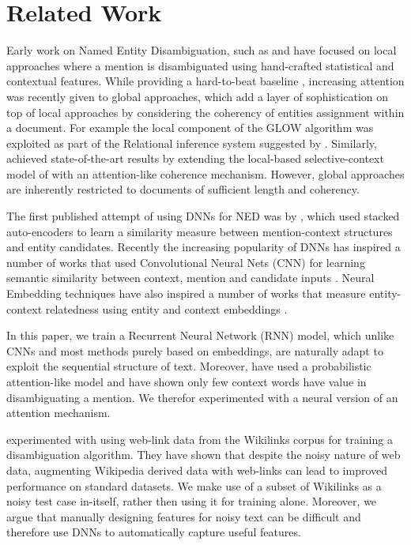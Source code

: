 \documentclass[11pt]{article}
\begin{document}
	\section{Related Work}
	
	Early work on Named Entity Disambiguation, such as  and  have focused on local approaches where a mention is disambiguated using hand-crafted statistical and contextual features. While providing a hard-to-beat baseline \cite{Ratinov2011}, increasing attention was recently given to global approaches, which add a layer of sophistication on top of local approaches by considering the coherency of entities assignment within a document. For example the local component of the GLOW algorithm \cite{Ratinov2011} was exploited as part of the Relational inference system suggested by . Similarly,  achieved state-of-the-art results by extending the local-based selective-context model of  with an attention-like coherence mechanism. However, global approaches are inherently restricted to documents of sufficient length and coherency.
	
	The first published attempt of using DNNs for NED was by , which used stacked auto-encoders to learn a similarity measure between mention-context structures and entity candidates. Recently the increasing popularity of DNNs has inspired a number of works that used Convolutional Neural Nets (CNN) for learning semantic similarity between context, mention and candidate inputs \cite{sun2015modeling,francis2016capturing}. Neural Embedding techniques have also inspired a number of works that measure entity-context relatedness using entity and context embeddings \cite{yamada2016joint,Hu2015Entity}.
	
	In this paper, we train a Recurrent Neural Network (RNN) model, which unlike CNNs and most methods purely based on embeddings, are naturally adapt to exploit the sequential structure of text. Moreover,  have used a probabilistic attention-like model and have shown only few context words have value in disambiguating a mention. We therefor experimented with a neural version of an attention mechanism.
	
	 experimented with using web-link data from the Wikilinks corpus \cite{singh12:wiki-links} for training a disambiguation algorithm. They have shown that despite the noisy nature of web data, augmenting Wikipedia derived data with web-links can lead to improved performance on standard datasets. We make use of a subset of Wikilinks as a noisy test case in-itself, rather then using it for training alone. Moreover, we argue that manually designing features for noisy text can be difficult and therefore use DNNs to automatically capture useful features.
	
\end{document}
